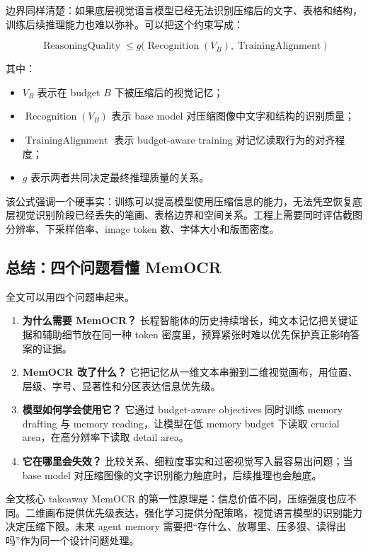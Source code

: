 边界同样清楚：如果底层视觉语言模型已经无法识别压缩后的文字、表格和结构，训练后续推理能力也难以弥补。可以把这个约束写成：

$$
\operatorname{ReasoningQuality}
\leq
g\bigl(\operatorname{Recognition}(V_B), \operatorname{TrainingAlignment}\bigr)
$$

其中：

\begin{itemize}
  \item $V_B$ 表示在 budget $B$ 下被压缩后的视觉记忆；
  \item $\operatorname{Recognition}(V_B)$ 表示 base model 对压缩图像中文字和结构的识别质量；
  \item $\operatorname{TrainingAlignment}$ 表示 budget-aware training 对记忆读取行为的对齐程度；
  \item $g$ 表示两者共同决定最终推理质量的关系。
\end{itemize}

该公式强调一个硬事实：训练可以提高模型使用压缩信息的能力，无法凭空恢复底层视觉识别阶段已经丢失的笔画、表格边界和空间关系。工程上需要同时评估截图分辨率、下采样倍率、image token 数、字体大小和版面密度。

\subsection{总结：四个问题看懂 MemOCR}

全文可以用四个问题串起来。

\begin{enumerate}
  \item \textbf{为什么需要 MemOCR？} 长程智能体的历史持续增长，纯文本记忆把关键证据和辅助细节放在同一种 token 密度里，预算紧张时难以优先保护真正影响答案的证据。
  \item \textbf{MemOCR 改了什么？} 它把记忆从一维文本串搬到二维视觉画布，用位置、层级、字号、显著性和分区表达信息优先级。
  \item \textbf{模型如何学会使用它？} 它通过 budget-aware objectives 同时训练 memory drafting 与 memory reading，让模型在低 memory budget 下读取 crucial area，在高分辨率下读取 detail area。
  \item \textbf{它在哪里会失效？} 比较关系、细粒度事实和过密视觉写入最容易出问题；当 base model 对压缩图像的文字识别能力触底时，后续推理也会触底。
\end{enumerate}

\begin{importantbox}{全文核心 takeaway}
MemOCR 的第一性原理是：信息价值不同，压缩强度也应不同。二维画布提供优先级表达，强化学习提供分配策略，视觉语言模型的识别能力决定压缩下限。未来 agent memory 需要把“存什么、放哪里、压多狠、读得出吗”作为同一个设计问题处理。
\end{importantbox}

